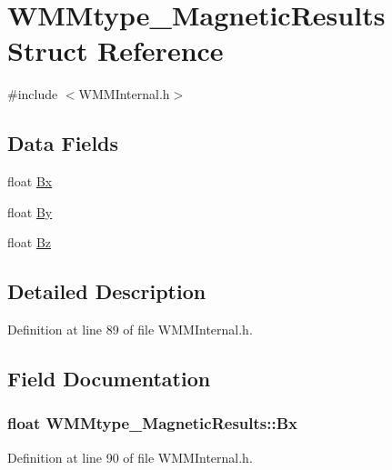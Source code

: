 \hypertarget{struct_w_m_mtype___magnetic_results}{\section{\-W\-M\-Mtype\-\_\-\-Magnetic\-Results \-Struct \-Reference}
\label{struct_w_m_mtype___magnetic_results}
}


{\ttfamily \#include $<$\-W\-M\-M\-Internal.\-h$>$}

\subsection*{\-Data \-Fields}
\begin{DoxyCompactItemize}
\item 
float \hyperlink{struct_w_m_mtype___magnetic_results_ab47b493b060af6221ee19270b4a39529}{\-Bx}
\item 
float \hyperlink{struct_w_m_mtype___magnetic_results_aa6dcc4f5525f563fd38032ca8ffbf02d}{\-By}
\item 
float \hyperlink{struct_w_m_mtype___magnetic_results_acdc0be68c71feef834382316e7ea69de}{\-Bz}
\end{DoxyCompactItemize}


\subsection{\-Detailed \-Description}


\-Definition at line 89 of file \-W\-M\-M\-Internal.\-h.



\subsection{\-Field \-Documentation}
\hypertarget{struct_w_m_mtype___magnetic_results_ab47b493b060af6221ee19270b4a39529}{
\subsubsection[{\-Bx}]{\setlength{\rightskip}{0pt plus 5cm}float {\bf \-W\-M\-Mtype\-\_\-\-Magnetic\-Results\-::\-Bx}}}\label{struct_w_m_mtype___magnetic_results_ab47b493b060af6221ee19270b4a39529}


\-Definition at line 90 of file \-W\-M\-M\-Internal.\-h.

